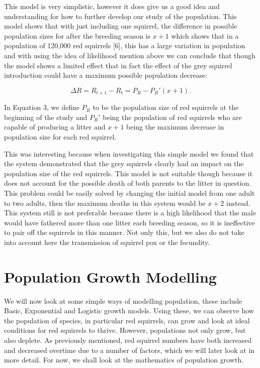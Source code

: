 \documentclass{article}
\begin{document}
This model is very simplistic, however it does give us a good idea and understanding for how to further develop our study of the population. This model shows that with just including one squirrel, the difference in possible population sizes for after the breeding season is $x+1$ which shows that in a population of 120,000 red squirrels [6], this has a large variation in population and with using the idea of likelihood mention above we can conclude that though the model shows a limited effect that in fact the effect of the grey squirrel introduction could have a maximum possible population decrease: 

\begin{equation}
\Delta R = R_{t+1}-R_{t}=P_{R}-P_{R}'(x+1).
\end{equation}

In Equation 3, we define $P_{R}$ to be the population size of red squirrels at the beginning of the study and $P_{R}'$ being the population of red squirrels who are capable of producing a litter and $x+1$ being the maximum decrease in population size for each red squirrel. 

This was interesting because when investigating this simple model we found that the system demonstrated that the grey squirrels clearly had an impact on the population size of the red squirrels. This model is not suitable though because it does not account for the possible death of both parents to the litter in question. This problem could be easily solved by changing the initial model from one adult to two adults, then the maximum deaths in this system would be $x+2$ instead. This system still is not preferable because there is a high likelihood that the male would have fathered more than one litter each breeding season, so it is ineffective to pair off the squirrels in this manner. Not only this, but we also do not take into account here the transmission of squirrel pox or the fecundity.








\section{Population Growth Modelling}

We will now look at some simple ways of modelling population, these include Basic, Exponential and Logistic growth models. Using these, we can observe how the population of species, in particular red squirrels, can grow and look at ideal conditions for red squirrels to thrive. However, populations not only grow, but also deplete. As previously mentioned, red squirrel numbers have both increased and decreased overtime due to a number of factors, which we will later look at in more detail. For now, we shall look at the mathematics of population growth.
\end{document}
